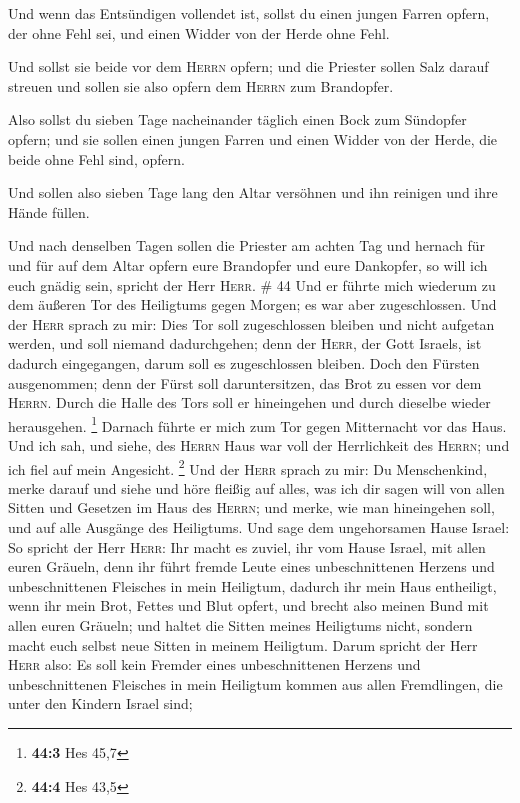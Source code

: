  Und wenn das Entsündigen vollendet ist, sollst du einen
jungen Farren opfern, der ohne Fehl sei, und einen Widder von der Herde
ohne Fehl.

 Und sollst sie beide vor dem \textsc{Herrn} opfern; und
die Priester sollen Salz darauf streuen und sollen sie also opfern dem
\textsc{Herrn} zum Brandopfer.

 Also sollst du sieben Tage nacheinander täglich einen
Bock zum Sündopfer opfern; und sie sollen einen jungen Farren und einen
Widder von der Herde, die beide ohne Fehl sind, opfern.

 Und sollen also sieben Tage lang den Altar versöhnen und
ihn reinigen und ihre Hände füllen.

 Und nach denselben Tagen sollen die Priester am achten
Tag und hernach für und für auf dem Altar opfern eure Brandopfer und
eure Dankopfer, so will ich euch gnädig sein, spricht der Herr
\textsc{Herr}. \# 44  Und er führte mich wiederum zu dem
äußeren Tor des Heiligtums gegen Morgen; es war aber zugeschlossen.
 Und der \textsc{Herr} sprach zu mir: Dies Tor soll
zugeschlossen bleiben und nicht aufgetan werden, und soll niemand
dadurchgehen; denn der \textsc{Herr}, der Gott Israels, ist dadurch
eingegangen, darum soll es zugeschlossen bleiben.  Doch
den Fürsten ausgenommen; denn der Fürst soll daruntersitzen, das Brot zu
essen vor dem \textsc{Herrn}. Durch die Halle des Tors soll er
hineingehen und durch dieselbe wieder herausgehen. \footnote{\textbf{44:3}
  Hes 45,7}  Darnach führte er mich zum Tor gegen
Mitternacht vor das Haus. Und ich sah, und siehe, des \textsc{Herrn}
Haus war voll der Herrlichkeit des \textsc{Herrn}; und ich fiel auf mein
Angesicht. \footnote{\textbf{44:4} Hes 43,5}  Und der
\textsc{Herr} sprach zu mir: Du Menschenkind, merke darauf und siehe und
höre fleißig auf alles, was ich dir sagen will von allen Sitten und
Gesetzen im Haus des \textsc{Herrn}; und merke, wie man hineingehen
soll, und auf alle Ausgänge des Heiligtums.  Und sage dem
ungehorsamen Hause Israel: So spricht der Herr \textsc{Herr}: Ihr macht
es zuviel, ihr vom Hause Israel, mit allen euren Gräueln, 
denn ihr führt fremde Leute eines unbeschnittenen Herzens und
unbeschnittenen Fleisches in mein Heiligtum, dadurch ihr mein Haus
entheiligt, wenn ihr mein Brot, Fettes und Blut opfert, und brecht also
meinen Bund mit allen euren Gräueln;  und haltet die
Sitten meines Heiligtums nicht, sondern macht euch selbst neue Sitten in
meinem Heiligtum.  Darum spricht der Herr \textsc{Herr}
also: Es soll kein Fremder eines unbeschnittenen Herzens und
unbeschnittenen Fleisches in mein Heiligtum kommen aus allen
Fremdlingen, die unter den Kindern Israel sind;

